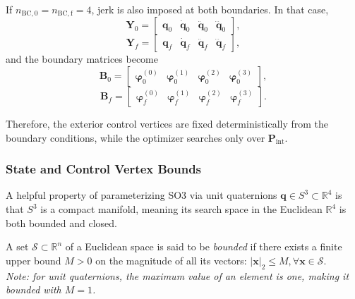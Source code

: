 If $n_{\mathrm{BC,0}}=n_{\mathrm{BC,f}}=4$, jerk is also imposed at both boundaries. In that
case,
\begin{equation}
    \mathbf{Y}_0
    =
    \begin{bmatrix}
        \mathbf{q}_0 &
        \dot{\mathbf{q}}_0 &
        \ddot{\mathbf{q}}_0 &
        \dddot{\mathbf{q}}_0
    \end{bmatrix},
\end{equation}
\begin{equation}
    \mathbf{Y}_f
    =
    \begin{bmatrix}
        \mathbf{q}_f &
        \dot{\mathbf{q}}_f &
        \ddot{\mathbf{q}}_f &
        \dddot{\mathbf{q}}_f
    \end{bmatrix},
\end{equation}
and the boundary matrices become
\begin{equation}
    \mathbf{B}_0
    =
    \begin{bmatrix}
        \boldsymbol{\varphi}^{(0)}_0 &
        \boldsymbol{\varphi}^{(1)}_0 &
        \boldsymbol{\varphi}^{(2)}_0 &
        \boldsymbol{\varphi}^{(3)}_0
    \end{bmatrix},
\end{equation}
\begin{equation}
    \mathbf{B}_f
    =
    \begin{bmatrix}
        \boldsymbol{\varphi}^{(0)}_f &
        \boldsymbol{\varphi}^{(1)}_f &
        \boldsymbol{\varphi}^{(2)}_f &
        \boldsymbol{\varphi}^{(3)}_f
    \end{bmatrix}.
\end{equation}

Therefore, the exterior control vertices are fixed deterministically from
the boundary conditions, while the optimizer searches only over
$\mathbf{P}_{\mathrm{int}}$.

\subsubsection{State and Control Vertex Bounds}
\label{sec:SC_state_CV_bounds}
A helpful property of parameterizing \ac{SO3} via unit quaternions $\mathbf{q} \in S^3 \subset \mathbb{R}^4$ is that $S^3$ is a compact manifold, meaning its search space in the Euclidean $\mathbb{R}^4$ is both bounded and closed.
\begin{dfn}[Bounded]
    A set $\mathcal{S} \subset \mathbb{R}^n$ of a Euclidean space is said to be \emph{bounded} if there exists a finite upper bound $M > 0$ on the magnitude of all its vectors: $\vert \mathbf{x} \vert_2 \leq M, \forall \mathbf{x} \in \mathcal{S}$.
    \\
    \emph{Note: for unit quaternions, the maximum value of an element is one, making it bounded with $M=1$.}
\end{dfn}

